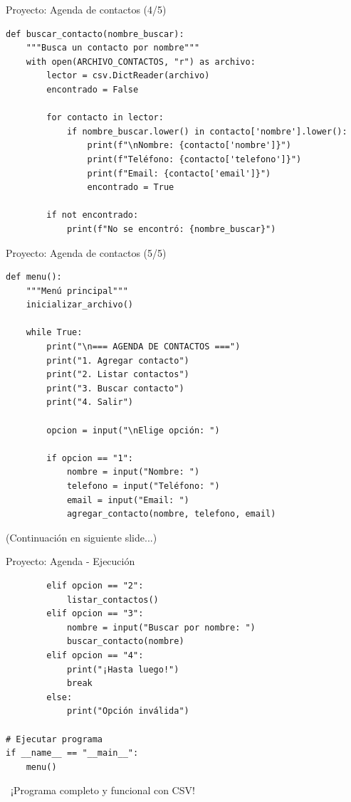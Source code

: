 \documentclass{beamer}
\begin{document}
\begin{frame}[fragile]{Proyecto: Agenda de contactos (4/5) \faSearch}
\begin{lstlisting}
def buscar_contacto(nombre_buscar):
    """Busca un contacto por nombre"""
    with open(ARCHIVO_CONTACTOS, "r") as archivo:
        lector = csv.DictReader(archivo)
        encontrado = False
        
        for contacto in lector:
            if nombre_buscar.lower() in contacto['nombre'].lower():
                print(f"\nNombre: {contacto['nombre']}")
                print(f"Teléfono: {contacto['telefono']}")
                print(f"Email: {contacto['email']}")
                encontrado = True
        
        if not encontrado:
            print(f"No se encontró: {nombre_buscar}")
\end{lstlisting}
\end{frame}

\begin{frame}[fragile]{Proyecto: Agenda de contactos (5/5) \faPlayCircle}
\begin{lstlisting}
def menu():
    """Menú principal"""
    inicializar_archivo()
    
    while True:
        print("\n=== AGENDA DE CONTACTOS ===")
        print("1. Agregar contacto")
        print("2. Listar contactos")
        print("3. Buscar contacto")
        print("4. Salir")
        
        opcion = input("\nElige opción: ")
        
        if opcion == "1":
            nombre = input("Nombre: ")
            telefono = input("Teléfono: ")
            email = input("Email: ")
            agregar_contacto(nombre, telefono, email)
\end{lstlisting}

\small(Continuación en siguiente slide...)
\end{frame}

\begin{frame}[fragile]{Proyecto: Agenda - Ejecución \faTerminal}
\begin{lstlisting}
        elif opcion == "2":
            listar_contactos()
        elif opcion == "3":
            nombre = input("Buscar por nombre: ")
            buscar_contacto(nombre)
        elif opcion == "4":
            print("¡Hasta luego!")
            break
        else:
            print("Opción inválida")

# Ejecutar programa
if __name__ == "__main__":
    menu()
\end{lstlisting}

\vspace{-0.1cm}
\begin{notebox}
\small\faRocket\ ¡Programa completo y funcional con CSV!
\end{notebox}
\end{frame}
\end{document}
